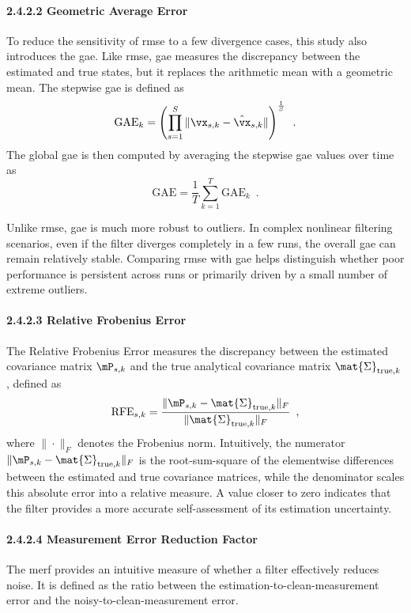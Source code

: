 \paragraph{2.4.2.2 Geometric Average Error}
To reduce the sensitivity of \ac{rmse} to a few divergence cases, this study also introduces the \ac{gae}. Like \ac{rmse}, \ac{gae} measures the discrepancy between the estimated and true states, but it replaces the arithmetic mean with a geometric mean. The stepwise \ac{gae} is defined as
\begin{equation}
	\text{GAE}_k = \left( \prod_{s=1}^{S} \|\vx_{s,k} - \hat{\vx}_{s,k}\| \right)^{\frac{1}{S}} \enspace.
\end{equation}
The global \ac{gae} is then computed by averaging the stepwise \ac{gae} values over time as
\begin{equation}
	\text{GAE} = \frac{1}{T} \sum_{k=1}^{T} \text{GAE}_k \enspace.
\end{equation}

Unlike \ac{rmse}, \ac{gae} is much more robust to outliers. In complex nonlinear filtering scenarios, even if the filter diverges completely in a few runs, the overall \ac{gae} can remain relatively stable. Comparing \ac{rmse} with \ac{gae} helps distinguish whether poor performance is persistent across runs or primarily driven by a small number of extreme outliers.

\paragraph{2.4.2.3 Relative Frobenius Error}
The Relative Frobenius Error measures the discrepancy between the estimated covariance matrix $\mP_{s,k}$ and the true analytical covariance matrix $\mat{\Sigma}_{\text{true}, k}$, defined as
\begin{equation}
	\text{RFE}_{s,k} = \frac{\|\mP_{s,k} - \mat{\Sigma}_{\text{true}, k}\|_F}{\|\mat{\Sigma}_{\text{true}, k}\|_F} \enspace,
	\label{eq:Rfe}
\end{equation}
where $\|\cdot\|_F$ denotes the Frobenius norm. Intuitively, the numerator $\|\mP_{s,k} - \mat{\Sigma}_{\text{true}, k}\|_F$ is the root-sum-square of the elementwise differences between the estimated and true covariance matrices, while the denominator scales this absolute error into a relative measure. A value closer to zero indicates that the filter provides a more accurate self-assessment of its estimation uncertainty.

\paragraph{2.4.2.4 Measurement Error Reduction Factor}
The \ac{merf} provides an intuitive measure of whether a filter effectively reduces noise. It is defined as the ratio between the estimation-to-clean-measurement error and the noisy-to-clean-measurement error.

